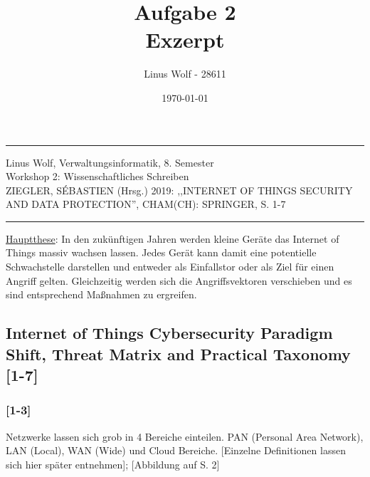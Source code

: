 \documentclass[11pt, a4paper, onecolumn, oneside, toc=bibliographynumbered, liststotoc]{scrartcl} %
\begin{document}
	\titlehead{Hochschule Rhein-Waal \\ %
	Fakultät: Kommunikation und Umwelt\\
	Studiengang: Verwaltungsinformatik\\
	Modul: Workshop 2: Wissenschaftliches Schreiben\\}
	\title{Aufgabe 2\\
	Exzerpt} %
	\author{Linus Wolf - 28611}
	\date{\today} %

\maketitle %


\newpage %

\rule{\textwidth}{0.4pt}
Linus Wolf, Verwaltungsinformatik, 8. Semester\\
Workshop 2: Wissenschaftliches Schreiben\\
ZIEGLER, SÉBASTIEN (Hrsg.) 2019: ,,INTERNET OF THINGS SECURITY AND DATA PROTECTION'', CHAM(CH): SPRINGER, S. 1-7

\rule{\textwidth}{0.4pt}

\underline{Hauptthese}: In den zukünftigen Jahren werden kleine Geräte das Internet of Things massiv wachsen lassen. Jedes Gerät kann damit eine potentielle Schwachstelle darstellen und entweder als Einfallstor oder als Ziel für einen Angriff gelten. Gleichzeitig werden sich die Angriffsvektoren verschieben und es sind entsprechend Maßnahmen zu ergreifen.

		\subsection*{Internet of Things Cybersecurity Paradigm Shift, Threat Matrix and Practical Taxonomy [1-7]}
			\subsubsection*{[1-3]}
Netzwerke lassen sich grob in 4 Bereiche einteilen. PAN (Personal Area Network), LAN (Local), WAN (Wide) und Cloud Bereiche. [Einzelne Definitionen lassen sich hier später entnehmen]; [Abbildung auf S. 2]
\end{document}
